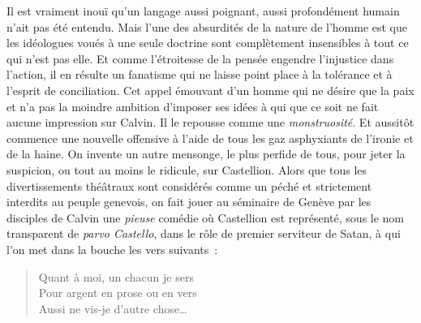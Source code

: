 \documentclass[french,twoside]{book} %
\newcommand\foreign[1]{\emph{#1}}
\begin{document}
\noindent Il est vraiment inouï qu’un langage aussi poignant, aussi profondément humain n’ait pas été entendu. Mais l’une des absurdités de la nature de l’homme est que les idéologues voués à une seule doctrine sont complètement insensibles à tout ce qui n’est pas elle. Et comme l’étroitesse de la pensée engendre l’injustice dans l’action, il en résulte un fanatisme qui ne laisse point place à la tolérance et à l’esprit de conciliation. Cet appel émouvant d’un homme qui ne désire que la paix et n’a pas la moindre ambition d’imposer ses idées à qui que ce soit ne fait aucune impression sur Calvin. Il le repousse comme une \emph{monstruosité}. Et aussitôt commence une nouvelle offensive à l’aide de tous les gaz asphyxiants de l’ironie et de la haine. On invente un autre mensonge, le plus perfide de tous, pour jeter la suspicion, ou tout au moins le ridicule, sur Castellion. Alors que tous les divertissements théâtraux sont considérés comme un péché et strictement interdits au peuple genevois, on fait jouer au séminaire de Genève par les disciples de Calvin une \emph{pieuse} comédie où Castellion est représenté, sous le nom transparent de \foreign{parvo Castello}, dans le rôle de premier serviteur de Satan, à qui l’on met dans la bouche les vers suivants :\par


\begin{verse}
Quant à moi, un chacun je sers\\
Pour argent en prose ou en vers\\
Aussi ne vis-je d’autre chose…\\
\end{verse}
\end{document}

